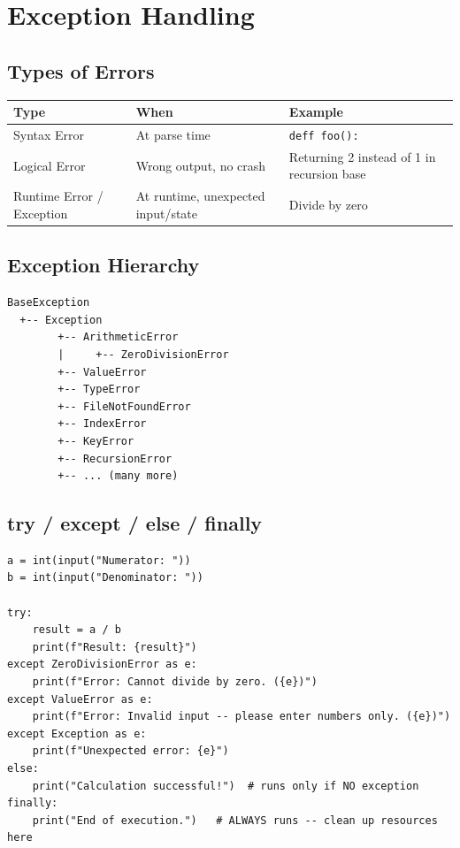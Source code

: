 \documentclass[12pt,a4paper]{article}
\begin{document}
\section{Exception Handling}

\subsection{Types of Errors}

\begin{center}
\begin{tabular}{lll}
\toprule
\textbf{Type} & \textbf{When} & \textbf{Example} \\
\midrule
Syntax Error & At parse time & \texttt{deff foo():} \\
Logical Error & Wrong output, no crash & Returning 2 instead of 1 in recursion base \\
Runtime Error / Exception & At runtime, unexpected input/state & Divide by zero \\
\bottomrule
\end{tabular}
\end{center}

\subsection{Exception Hierarchy}

\begin{verbatim}
BaseException
  +-- Exception
        +-- ArithmeticError
        |     +-- ZeroDivisionError
        +-- ValueError
        +-- TypeError
        +-- FileNotFoundError
        +-- IndexError
        +-- KeyError
        +-- RecursionError
        +-- ... (many more)
\end{verbatim}

\subsection{try / except / else / finally}

\begin{lstlisting}
a = int(input("Numerator: "))
b = int(input("Denominator: "))

try:
    result = a / b
    print(f"Result: {result}")
except ZeroDivisionError as e:
    print(f"Error: Cannot divide by zero. ({e})")
except ValueError as e:
    print(f"Error: Invalid input -- please enter numbers only. ({e})")
except Exception as e:
    print(f"Unexpected error: {e}")
else:
    print("Calculation successful!")  # runs only if NO exception
finally:
    print("End of execution.")   # ALWAYS runs -- clean up resources here
\end{lstlisting}
\end{document}

